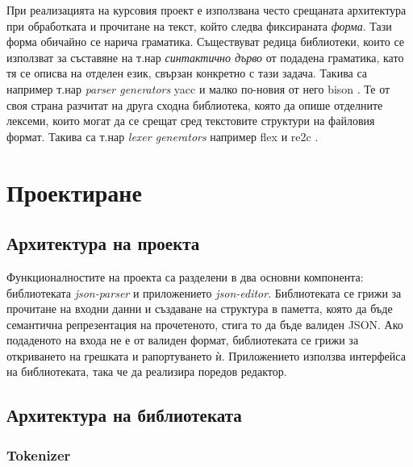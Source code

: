 \documentclass[10pt]{article}
\begin{document}
\par
При реализацията на курсовия проект е използвана често срещаната архитектура при обработката и прочитане на текст, който следва фиксираната \textit{форма}. Тази форма обичайно се нарича граматика. Съществуват редица библиотеки, които се използват за съставяне на т.нар \textit{синтактично дърво} от подадена граматика, като тя се описва на отделен език, свързан конкретно с тази задача. Такива са например т.нар \textit{parser generators} yacc \autocite{yacc} и малко по-новия от него bison \autocite{bison}. Те от своя страна разчитат на друга сходна библиотека, която да опише отделните лексеми, които могат да се срещат сред текстовите структури на файловия формат. Такива са т.нар \textit{lexer generators} например flex \autocite{flex} и re2c \autocite{re2c}.

\section{Проектиране}

\subsection{Архитектура на проекта}

Функционалностите на проекта са разделени в два основни компонента: библиотеката \textit{json-parser} и приложението \textit{json-editor}. Библиотеката се грижи за прочитане на входни данни и създаване на структура в паметта, която да бъде семантична репрезентация на прочетеното, стига то да бъде валиден JSON. Ако подаденото на входа не е от валиден формат, библиотеката се грижи за откриването на грешката и рапортуването ѝ. Приложението използва интерфейса на библиотеката, така че да реализира поредов редактор.

\subsection{Архитектура на библиотеката}

\subsubsection{Tokenizer} \label{tokenizer-design}
\end{document}
